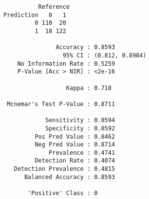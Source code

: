 \documentclass{article}
\begin{document}
\begin{thebibliography}{9}
\begin{verbatim}
          Reference
Prediction   0   1
         0 110  20
         1  18 122
                                         
               Accuracy : 0.8593         
                 95% CI : (0.812, 0.8984)
    No Information Rate : 0.5259         
    P-Value [Acc > NIR] : <2e-16         
                                         
                  Kappa : 0.718          
                                         
 Mcnemar's Test P-Value : 0.8711         
                                         
            Sensitivity : 0.8594         
            Specificity : 0.8592         
         Pos Pred Value : 0.8462         
         Neg Pred Value : 0.8714         
             Prevalence : 0.4741         
         Detection Rate : 0.4074         
   Detection Prevalence : 0.4815         
      Balanced Accuracy : 0.8593         
                                         
       'Positive' Class : 0              

\end{verbatim}

\end{thebibliography}
\end{document}
